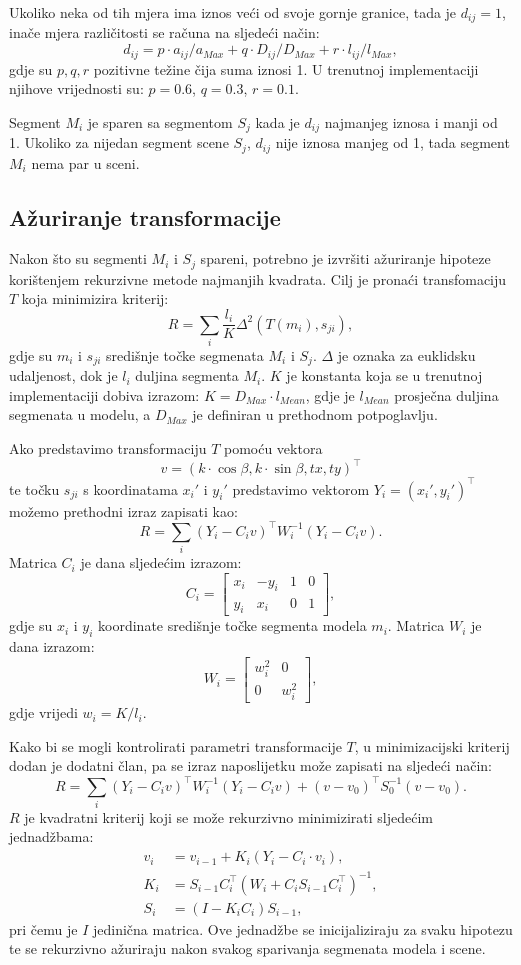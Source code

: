 \documentclass[lmodern, utf8, seminar, numeric]{fer}
\begin{document}
Ukoliko neka od tih mjera ima iznos veći od svoje gornje granice, tada je
$d_{ij}=1$, inače mjera različitosti se računa na sljedeći način:
\begin{equation}
d_{ij}=p\cdot a_{ij}/a_{Max}+q\cdot D_{ij}/D_{Max}+r\cdot l_{ij}/l_{Max},
\end{equation}
gdje su $p,q,r$ pozitivne težine čija suma iznosi 1. U trenutnoj implementaciji
njihove vrijednosti su: $p=0.6$, $q =0.3$, $r=0.1$.

Segment $M_i$ je sparen sa segmentom $S_j$ kada je $d_{ij}$ najmanjeg iznosa i
manji od 1. Ukoliko za nijedan segment scene $S_j$, $d_{ij}$ nije iznosa manjeg
od 1, tada segment $M_i$ nema par u sceni.


\subsection{Ažuriranje transformacije}
Nakon što su segmenti $M_i$ i $S_j$ spareni, potrebno je izvršiti ažuriranje
hipoteze korištenjem rekurzivne metode najmanjih kvadrata. Cilj je pronaći
transfomaciju $T$ koja minimizira kriterij:
$$R=\sum_i \frac{l_i}{K}\Delta^2(T(m_i),s_{ji}),$$
gdje su $m_i$ i $s_{ji}$ središnje točke segmenata $M_i$ i $S_j$. $\Delta$ je
oznaka za euklidsku udaljenost, dok je $l_i$ duljina segmenta $M_i$. $K$ je
konstanta koja se u trenutnoj implementaciji dobiva izrazom: $K = D_{Max}\cdot
l_{Mean}$, gdje je $l_{Mean}$ prosječna duljina segmenata u modelu, a $D_{Max}$
je definiran u prethodnom potpoglavlju.


Ako predstavimo transformaciju $T$ pomoću vektora
$$ v=(k\cdot  \cos\beta, k\cdot \sin\beta, tx,t y)^\top$$
te točku $s_{ji}$  s koordinatama $x_i'$ i $y_i'$
predstavimo vektorom ${Y_i}=(x_i',y_i')^\top$ možemo prethodni izraz zapisati
kao:
$$R=\sum_i({Y_i}-C_i v)^\top W_i^{-1}({Y_i}-C_i v).$$
Matrica $C_i$ je dana sljedećim izrazom:
$$C_i = \left [ \begin{array}{cccc}
x_i & -y_i & 1 & 0\\
y_i & x_i & 0 & 1
\end{array} \right ],$$
gdje su $x_i$ i $y_i$ koordinate središnje točke segmenta modela $m_i$. Matrica $W_i$ je dana izrazom:
$$W_i = \left [ \begin{array}{cc}
w_i^2 & 0\\
0 & w_i^2
\end{array} \right ],$$
gdje vrijedi $w_i = K/l_i$.

Kako bi se mogli kontrolirati parametri transformacije $T$, u minimizacijski kriterij dodan je dodatni član, pa se izraz naposlijetku može zapisati na sljedeći način:
$$R=\sum_i({Y_i}-C_i v)^\top W_i^{-1}({Y_i}-C_i v)+( v -  v_0)^\top S_0^{-1}( v- v_0).$$
$R$ je kvadratni kriterij koji se može rekurzivno minimizirati sljedećim jednadžbama:
\begin{align*}
v_i & = v_{i-1}+K_i(Y_i-C_i\cdot v_i),\\
K_i & = S_{i-1}C_i^\top(W_i+C_iS_{i-1}C_i^\top)^{-1},\\
S_i & = (I - K_i C_i)S_{i-1},
\end{align*}
pri čemu je $I$ jedinična matrica.
Ove jednadžbe se inicijaliziraju za svaku hipotezu te se rekurzivno ažuriraju nakon svakog sparivanja segmenata modela i scene.
\end{document}
